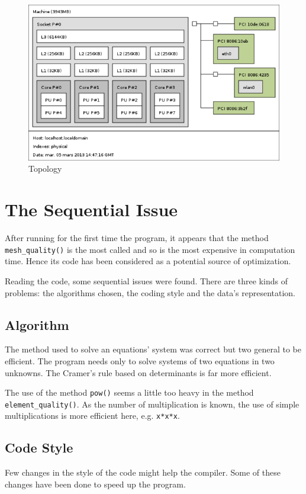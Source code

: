 \documentclass[fleqn,11pt]{SelfArx} %
\begin{document}
\begin{figure}[h]
	\centering

	\includegraphics[width=.48\textwidth]{topo.png}

	\caption{Topology}
	\label{topo}
\end{figure}



\section{The Sequential Issue}

After running for the first time the program, it appears that the method \verb+mesh_quality()+ is the most called and so is the most expensive in computation time. Hence its code has been considered as a potential source of optimization.

Reading the code, some sequential issues were found. There are three kinds of problems: the algorithms chosen, the coding style and the data's representation.

\subsection{Algorithm}

The method used to solve an equations' system was correct but two general to be efficient. The program needs only to solve systems of two equations in two unknowns. The Cramer's rule based on determinants is far more efficient.

The use of the method \verb+pow()+ seems a little too heavy in the method \verb+element_quality()+. As the number of multiplication is known, the use of simple multiplications is more efficient here, e.g. \verb+x*x*x+.

\subsection{Code Style}

Few changes in the style of the code might help the compiler. Some of these changes have been done to speed up the program.
\end{document}
